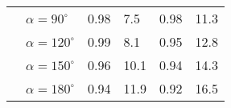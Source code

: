 \begin{table}[t]
\begin{tabular}{ll|ll|ll}
\multicolumn{1}{l|}{}                                                                                           & $\alpha = 90^\circ$   &   0.98         &       7.5    &        0.98    &    11.3       \\
\multicolumn{1}{l|}{}                                                                                           & $\alpha = 120^\circ $ &   0.99          &     8.1      &        0.95    &   12.8        \\
\multicolumn{1}{l|}{}                                                                                           & $\alpha = 150^\circ$  &   0.96         &        10.1   &         0.94   &  14.3         \\
\multicolumn{1}{l|}{}                                                                                           & $\alpha = 180^\circ $ &  0.94         &         11.9  &       0.92     &   16.5        \\ \hline
\end{tabular}
\end{table}